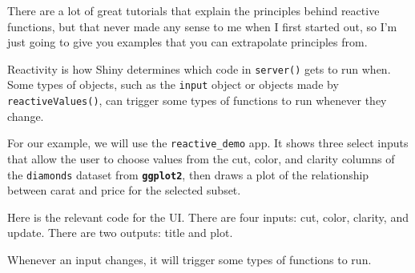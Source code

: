 \documentclass[
  oneside]{book}
\newenvironment{Shaded}{\begin{snugshade}}{\end{snugshade}}
\newcommand{\AttributeTok}[1]{\textcolor[rgb]{0.77,0.63,0.00}{#1}}
\newcommand{\ConstantTok}[1]{\textcolor[rgb]{0.00,0.00,0.00}{#1}}
\newcommand{\FunctionTok}[1]{\textcolor[rgb]{0.00,0.00,0.00}{#1}}
\newcommand{\NormalTok}[1]{#1}
\newcommand{\SpecialCharTok}[1]{\textcolor[rgb]{0.00,0.00,0.00}{#1}}
\newcommand{\StringTok}[1]{\textcolor[rgb]{0.31,0.60,0.02}{#1}}
\begin{document}
There are a lot of great tutorials that explain the principles behind reactive functions, but that never made any sense to me when I first started out, so I'm just going to give you examples that you can extrapolate principles from.

Reactivity is how Shiny determines which code in \texttt{server}\texttt{()} gets to run when. Some types of objects, such as the \texttt{input} object or objects made by \texttt{reactiveValues}\texttt{()}, can trigger some types of functions to run whenever they change.

For our example, we will use the \texttt{reactive\_demo} app. It shows three select inputs that allow the user to choose values from the cut, color, and clarity columns of the \texttt{diamonds} dataset from \textbf{\texttt{ggplot2}}, then draws a plot of the relationship between carat and price for the selected subset.

Here is the relevant code for the UI. There are four inputs: cut, color, clarity, and update. There are two outputs: title and plot.

\begin{Shaded}
\end{Shaded}

Whenever an input changes, it will trigger some types of functions to run.
\end{document}

